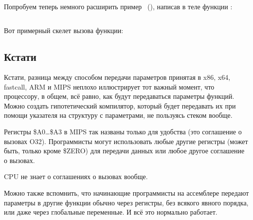 \chapter{\PrintfSeveralArgumentsSectionName}

Попробуем теперь немного расширить пример \IT{\HelloWorldSectionName}~(),
написав в теле функции \main:




\ifdefined\IncludeARM

\fi
\ifdefined\IncludeMIPS

\fi

\section{\Conclusion{}}

Вот примерный скелет вызова функции:





\ifdefined\IncludeGCC

\fi

\ifdefined\IncludeARM



\fi

\ifdefined\IncludeMIPS
{}

\fi

\section{Кстати}

Кстати, разница между способом передачи параметров принятая в x86, x64, fastcall, ARM и MIPS неплохо иллюстрирует тот важный момент, что процессору, в общем, всё равно, как будут 
передаваться параметры функций. Можно создать гипотетический компилятор, который будет передавать их при 
помощи указателя на структуру с параметрами, не пользуясь стеком вообще.

\ifdefined\IncludeMIPS
{}
Регистры \$A0\dots \$A3 в MIPS так названы только для удобства (это соглашение о вызовах O32).
Программисты могут использовать любые другие регистры (может быть, только кроме \$ZERO) для
передачи данных или любое другое соглашение о вызовах.
\fi

\ac{CPU} не знает о соглашениях о вызовах вообще.

Можно также вспомнить, что начинающие программисты на ассемблере передают параметры 
в другие функции обычно через регистры, без всякого явного порядка, или даже через глобальные переменные.
И всё это нормально работает.

